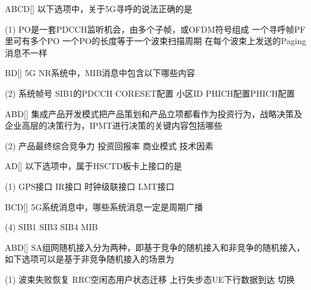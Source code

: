 \begin{choice}{\;ABCD\;}[]
    以下选项中，关于5G寻呼的说法正确的是
    \begin{tasks}(1)
        \task PO是一套PDCCH监听机会，由多个子帧，或OFDM符号组成
        \task 一个寻呼帧PF里可有多个PO
        \task 一个PO的长度等于一个波束扫描周期
        \task 在每个波束上发送的Paging消息不一样
    \end{tasks}
\end{choice}

\begin{choice}{\;BD\;}[]
    5G NR系统中，MIB消息中包含以下哪些内容
    \begin{tasks}(2)
        \task 系统帧号
        \task SIB1的PDCCH CORESET配置
        \task 小区ID
        \task PHICH配置PHICH配置
    \end{tasks}
\end{choice}

\begin{choice}{\;ABD\;}[]
    集成产品开发模式把产品策划和产品立项都看作为投资行为，战略决策及企业高层的决策行为，IPMT进行决策的关键内容包括哪些
    \begin{tasks}(2)
        \task 产品最终综合竞争力
        \task 投资回报率
        \task 商业模式
        \task 技术因素
    \end{tasks}
\end{choice}

\begin{choice}{\;AD\;}[]
    以下选项中，属于HSCTD板卡上接口的是
    \begin{tasks}(1)
        \task GPS接口
        \task IR接口
        \task  时钟级联接口
        \task LMT接口
    \end{tasks}
\end{choice}

\begin{choice}{\;BCD\;}[]
    5G系统消息中，哪些系统消息一定是周期广播
    \begin{tasks}(4)
        \task SIB1
        \task SIB3
        \task SIB4
        \task MIB
    \end{tasks}
\end{choice}

\begin{choice}{\;ABD\;}[]
    SA组网随机接入分为两种，即基于竞争的随机接入和非竞争的随机接入，如下选项可以是基于非竞争随机接入的场景为
    \begin{tasks}(1)
        \task 波束失败恢复
        \task RRC空闲态用户状态迁移
        \task 上行失步态UE下行数据到达
        \task 切换
    \end{tasks}
\end{choice}

